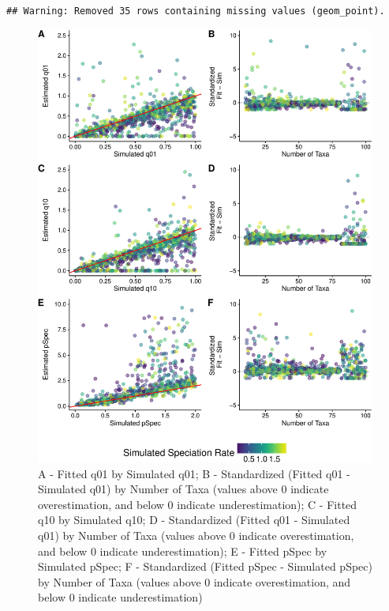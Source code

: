 \documentclass[12pt,]{article}
\begin{document}
\begin{verbatim}
## Warning: Removed 35 rows containing missing values (geom_point).
\end{verbatim}

\begin{figure}[htbp]
\centering
\includegraphics{report_Nov8th_files/figure-latex/unnamed-chunk-3-1.pdf}
\caption{A - Fitted q01 by Simulated q01; B - Standardized (Fitted q01 -
Simulated q01) by Number of Taxa (values above 0 indicate
overestimation, and below 0 indicate underestimation); C - Fitted q10 by
Simulated q10; D - Standardized (Fitted q01 - Simulated q01) by Number
of Taxa (values above 0 indicate overestimation, and below 0 indicate
underestimation); E - Fitted pSpec by Simulated pSpec; F - Standardized
(Fitted pSpec - Simulated pSpec) by Number of Taxa (values above 0
indicate overestimation, and below 0 indicate underestimation)}
\end{figure}

\newpage
\end{document}
